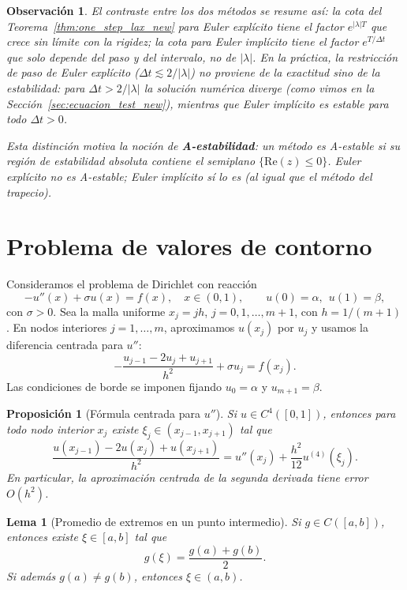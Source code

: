 \documentclass[a4paper,11pt]{report}
\newtheorem{lemma}[theorem]{Lema}
\newtheorem{proposition}[theorem]{Proposición}
\newtheorem{remark}[theorem]{Observación}
\begin{document}
\begin{remark}
El contraste entre los dos métodos se resume así: la cota del Teorema~\ref{thm:one_step_lax_new} para Euler explícito tiene el factor $e^{|\lambda|T}$ que crece sin límite con la rigidez; la cota para Euler implícito tiene el factor $e^{T/\Delta t}$ que solo depende del paso y del intervalo, no de $|\lambda|$. En la práctica, la restricción de paso de Euler explícito ($\Delta t\lesssim 2/|\lambda|$) no proviene de la exactitud sino de la \emph{estabilidad}: para $\Delta t>2/|\lambda|$ la solución numérica diverge (como vimos en la Sección~\ref{sec:ecuacion_test_new}), mientras que Euler implícito es estable para todo $\Delta t>0$.

Esta distinción motiva la noción de \textbf{A-estabilidad}: un método es A-estable si su región de estabilidad absoluta contiene el semiplano $\{\mathrm{Re}(z)\le0\}$. Euler explícito no es A-estable; Euler implícito sí lo es (al igual que el método del trapecio).
\end{remark}


\section{Problema de valores de contorno}

Consideramos el problema de Dirichlet con reacción
\[
-u''(x)+\sigma u(x)=f(x),\quad x\in(0,1),\qquad u(0)=\alpha,\ \ u(1)=\beta,
\]
con $\sigma>0$. Sea la malla uniforme $x_j=jh$, $j=0,1,\dots,m+1$, con $h=1/(m+1)$. En nodos interiores $j=1,\dots,m$, aproximamos $u(x_j)$ por $u_j$ y usamos la diferencia centrada para $u''$:
\[
  -\frac{u_{j-1}-2u_j+u_{j+1}}{h^2}+\sigma u_j=f(x_j).
\]
Las condiciones de borde se imponen fijando $u_0=\alpha$ y $u_{m+1}=\beta$.

\begin{proposition}[Fórmula centrada para $u''$]\label{prop:centered_second_derivative_new}
Si $u\in C^4([0,1])$, entonces para todo nodo interior $x_j$ existe $\xi_j\in(x_{j-1},x_{j+1})$ tal que
\[
  \frac{u(x_{j-1})-2u(x_j)+u(x_{j+1})}{h^2}
  =u''(x_j)+\frac{h^2}{12}u^{(4)}(\xi_j).
\]
En particular, la aproximación centrada de la segunda derivada tiene error $O(h^2)$.
\end{proposition}

\begin{lemma}[Promedio de extremos en un punto intermedio]\label{lem:average_bolzano_new}
Si $g\in C([a,b])$, entonces existe $\xi\in[a,b]$ tal que
\[
g(\xi)=\frac{g(a)+g(b)}{2}.
\]
Si además $g(a)\neq g(b)$, entonces $\xi\in(a,b)$.
\end{lemma}
\end{document}
